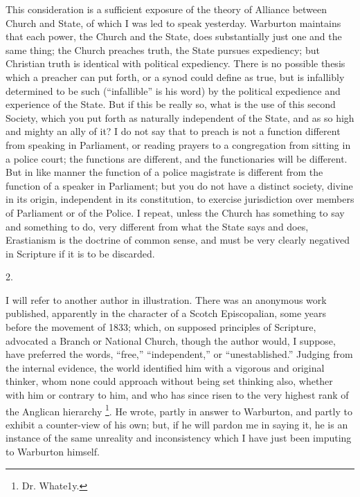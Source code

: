 This consideration is a sufficient exposure of the theory of
Alliance between Church and State, of which I was led to speak
yesterday. Warburton maintains that each power, the Church and the
State, does substantially just one and the same thing; the Church
preaches truth, the State pursues expediency; but Christian truth is
identical with political expediency. There is no possible thesis which
a preacher can put forth, or a synod could define as true, but is
infallibly determined to be such (``infallible'' is his word)
by the political expedience and experience of the State. But if this
be really so, what is the use of this second Society, which you put
forth as naturally independent of the State, and as so high and mighty
an ally of it? I do not say that to preach is not a function different
from speaking in Parliament, or reading prayers to a congregation from
sitting in a police court; the functions are different, and the
functionaries will be different. But in like manner the function of a
police magistrate is different from the function of a speaker in
Parliament; but you do not have a distinct society, divine in its
origin, independent in its constitution, to exercise jurisdiction over
members of Parliament or of the Police. I repeat, unless the Church
has something to say and something to do, very different from what the
State says and does, Erastianism is the doctrine of common sense, and
must be very clearly negatived in Scripture if it is to be discarded.

2.

I will refer to another author in illustration. There was an
anonymous work published, apparently in the character of a Scotch
Episcopalian, some years before the movement of 1833; which, on
supposed principles of Scripture, advocated a Branch or National
Church, though the author would, I suppose, have preferred the words,
``free,'' ``independent,'' or ``unestablished.''
Judging from the internal evidence, the world identified him with a
vigorous and original thinker, whom none could approach without being
set thinking also, whether with him or contrary to him, and who has
since risen to the very highest rank of the Anglican hierarchy \footnote{Dr. Whate1y.}. He wrote, partly in answer to Warburton, and partly to
exhibit a counter-view of his own; but, if he will pardon me in saying
it, he is an instance of the same unreality and inconsistency which I
have just been imputing to Warburton himself.

